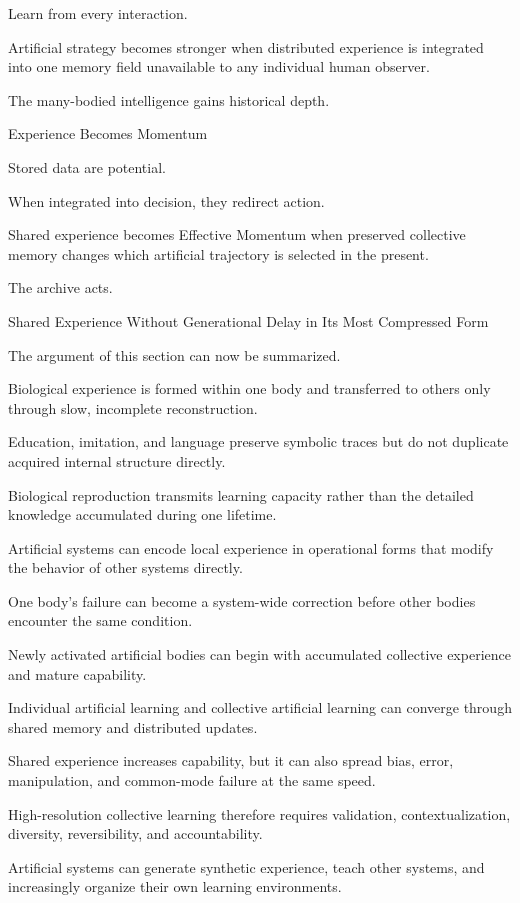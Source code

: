 Learn from every interaction.

Artificial strategy becomes stronger when distributed experience is integrated into one memory field unavailable to any individual human observer.

The many-bodied intelligence gains historical depth.

Experience Becomes Momentum

Stored data are potential.

When integrated into decision, they redirect action.

Shared experience becomes Effective Momentum when preserved collective memory changes which artificial trajectory is selected in the present.

The archive acts.

Shared Experience Without Generational Delay in Its Most Compressed Form

The argument of this section can now be summarized.

Biological experience is formed within one body and transferred to others only through slow, incomplete reconstruction.

Education, imitation, and language preserve symbolic traces but do not duplicate acquired internal structure directly.

Biological reproduction transmits learning capacity rather than the detailed knowledge accumulated during one lifetime.

Artificial systems can encode local experience in operational forms that modify the behavior of other systems directly.

One body’s failure can become a system-wide correction before other bodies encounter the same condition.

Newly activated artificial bodies can begin with accumulated collective experience and mature capability.

Individual artificial learning and collective artificial learning can converge through shared memory and distributed updates.

Shared experience increases capability, but it can also spread bias, error, manipulation, and common-mode failure at the same speed.

High-resolution collective learning therefore requires validation, contextualization, diversity, reversibility, and accountability.

Artificial systems can generate synthetic experience, teach other systems, and increasingly organize their own learning environments.

